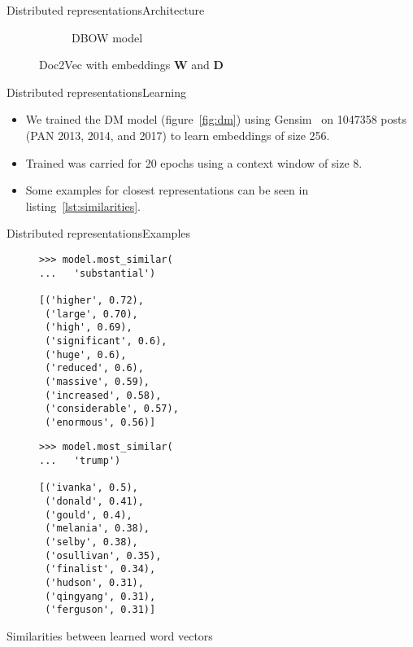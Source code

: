 \documentclass[xcolor={svgnames, table}, usepdftitle=false]{beamer}
\newcommand*{\mat}{\symbf}
\begin{document}
\begin{frame}{Distributed representations}{Architecture}
\begin{figure}
\begin{subfigure}[b]{.40\textwidth}
      \caption{DBOW model}\label{fig:dbow}
    \end{subfigure}
    \caption{\textsf{Doc2Vec} with embeddings \(\mat W\) and \(\mat D\)}
  \end{figure}
\end{frame}

\begin{frame}{Distributed representations}{Learning}
  \begin{itemize}
  \item We trained the DM model (figure~\autoref{fig:dm}) using
    Gensim~\autocite{rehurek_lrec} on \num{1047358} posts (PAN 2013,
    2014, and 2017) to learn embeddings of size \num{256}.
  \item Trained was carried for \num{20} epochs using a context window
    of size \num{8}.
  \item Some examples for closest representations can be seen in
    listing~\autoref{lst:similarities}.
  \end{itemize}
\end{frame}

\begin{frame}[fragile]{Distributed representations}{Examples}
\begin{listing}[H]
\centering
\begin{subfigure}[b]{.45\linewidth}
\begin{verbatim}
>>> model.most_similar(
...   'substantial')

[('higher', 0.72),
 ('large', 0.70),
 ('high', 0.69),
 ('significant', 0.6),
 ('huge', 0.6),
 ('reduced', 0.6),
 ('massive', 0.59),
 ('increased', 0.58),
 ('considerable', 0.57),
 ('enormous', 0.56)]
\end{verbatim}
\end{subfigure}
\begin{subfigure}[b]{.45\linewidth}
\begin{verbatim}
>>> model.most_similar(
...   'trump')

[('ivanka', 0.5),
 ('donald', 0.41),
 ('gould', 0.4),
 ('melania', 0.38),
 ('selby', 0.38),
 ('osullivan', 0.35),
 ('finalist', 0.34),
 ('hudson', 0.31),
 ('qingyang', 0.31),
 ('ferguson', 0.31)]
\end{verbatim}
\end{subfigure}
\caption{Similarities between learned word vectors}\label{lst:similarities}
\end{listing}
\end{frame}
\end{document}
